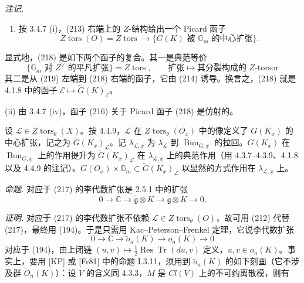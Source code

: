 \emph{注记.}
\begin{enumerate}[label=(\roman*),leftmargin=2.2em]
\item 按 3.4.7 (i)，(213) 右端上的 $Z$-结构给出一个 Picard 函子
\begin{equation}\tag{218}
Z\operatorname{tors}(O)=Z\operatorname{tors}\to\{G(K)\text{ 被 }\mathbb{G}_{m}\text{ 的中心扩张}\}.
\end{equation}
\end{enumerate}


显式地，(218) 是如下两个函子的复合。其一是典范等价
\begin{equation}\tag{219}
\{\mathbb{G}_{m}\text{ 对 }Z^{\vee}\text{ 的平凡扩张}\}=Z\operatorname{tors},\qquad
\text{扩张}\mapsto\text{其分裂构成的 }Z\text{-torsor}
\end{equation}
其二是从 (219) 左端到 (218) 右端的函子，它由 (214) 诱导。换言之，(218) 就是 4.1.8 中的函子 $\mathcal{E}\mapsto\tilde{G}(K)_{\mathcal{E}}$。

(ii) 由 3.4.7 (iv)，函子 (216) 关于 Picard 函子 (218) 是仿射的。

 设 $\mathcal{L}\in Z\operatorname{tors}_{\theta}(X)$。按 4.4.9，$\mathcal{L}$ 在 $Z\operatorname{tors}_{\theta}(O_{x})$ 中的像定义了 $G(K_{x})$ 的中心扩张，记之为 $\tilde{G}(K_{x})_{\mathcal{L}}$。记 $\lambda_{\mathcal{L},\underline{x}}$ 为 $\lambda_{\mathcal{L}}$ 到 $\operatorname{Bun}_{G,\underline{x}}$ 的拉回。$G(K_{x})$ 在 $\operatorname{Bun}_{G,\underline{x}}$ 上的作用提升为 $\tilde{G}(K_{x})_{\mathcal{L}}$ 在 $\lambda_{\mathcal{L},\underline{x}}$ 上的典范作用（用 4.3.7–4.3.9、4.1.8 以及 4.4.9 的注记）。$G(O_{x})\times\mathbb{G}_{m}\subset\tilde{G}(K_{x})_{\mathcal{L}}$ 以显然的方式作用在 $\lambda_{\mathcal{L},\underline{x}}$ 上。

 \emph{命题.} 对应于 (217) 的李代数扩张是 2.5.1 中的扩张
\[
0\to\mathbb{C}\to\widetilde{\mathfrak{g}}\otimes K\to\mathfrak{g}\otimes K\to 0.
\]

\emph{证明.} 对应于 (217) 的李代数扩张不依赖 $\mathcal{L}\in Z\operatorname{tors}_{\theta}(O)$，故可用 (212) 代替 (217)，最终用 (194)。于是只需用 Kac–Peterson–Frenkel 定理，它说李代数扩张
\begin{equation}\tag{220}
0\to\mathbb{C}\to\tilde{o}_{n}(K)\to o_{n}(K)\to 0
\end{equation}
对应于 (194)，由上闭链 $(u,v)\mapsto\frac{1}{2}\operatorname{Res}\operatorname{Tr}(du,v)$ 定义，$u,v\in o_{n}(K)$。事实上，要用 [KP] 或 [Fr81] 中的命题 I.3.11，须用到 $\tilde{o}_{n}(K)$ 的如下刻画（它不涉及群 $\tilde{O}_{n}(K)$）：设 $V$ 的含义同 4.3.3，$M$ 是 $Cl(V)$ 上的不可约离散模，则有


